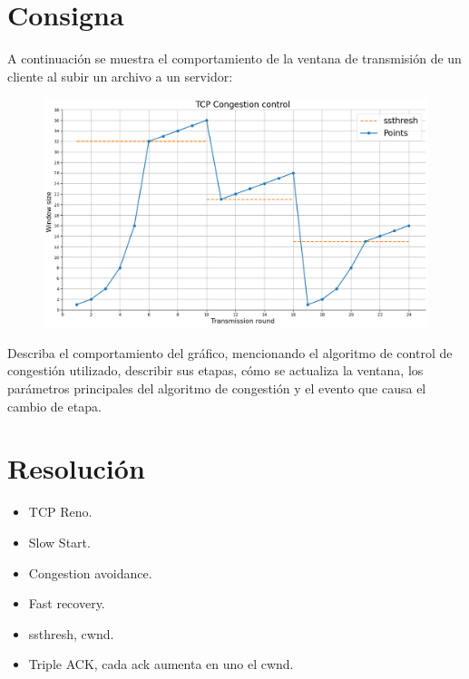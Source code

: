 \section*{Consigna}

A continuación se muestra el comportamiento de la ventana de transmisión de un cliente al subir un archivo a un servidor:

\begin{figure}[H]
    \centering
    \includegraphics[width=0.95\linewidth]{Images/grafico.png}
\end{figure}

Describa el comportamiento del gráfico, mencionando el algoritmo de control de congestión utilizado, describir sus etapas, cómo se actualiza la ventana, los parámetros principales del algoritmo de congestión y el evento que causa el cambio de etapa.

\section*{Resolución}

\begin{itemize}
\item TCP Reno.
\item Slow Start.
\item Congestion avoidance.
\item Fast recovery.
\item ssthresh, cwnd.
\item Triple ACK, cada ack aumenta en uno el cwnd.
\end{itemize}


